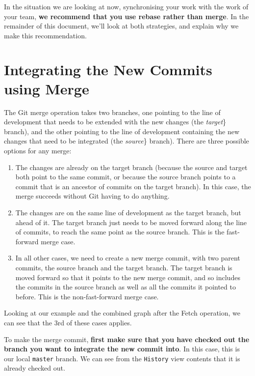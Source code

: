 \documentclass[
]{book}
\providecommand{\tightlist}{%
  \setlength{\itemsep}{0pt}\setlength{\parskip}{0pt}}
\begin{document}
In the situation we are looking at now, synchronising your work with the work of your team, \textbf{we recommend that you use rebase rather than merge}. In the remainder of this document, we'll look at both strategies, and explain why we make this recommendation.

\hypertarget{integrating-the-new-commits-using-merge}{%
\section{Integrating the New Commits using Merge}\label{integrating-the-new-commits-using-merge}}

The Git merge operation takes two branches, one pointing to the line of development that needs to be extended with the new changes (the \emph{target}\} branch), and the other pointing to the line of development containing the new changes that need to be integrated (the \emph{source}\} branch). There are three possible options for any merge:

\begin{enumerate}
\def\labelenumi{\arabic{enumi}.}
\tightlist
\item
  The changes are already on the target branch (because the source and target both point to the same commit, or because the source branch points to a commit that is an ancestor of commits on the target branch). In this case, the merge succeeds without Git having to do anything.
\item
  The changes are on the same line of development as the target branch, but ahead of it. The target branch just needs to be moved forward along the line of commits, to reach the same point as the source branch. This is the fast-forward merge case.
\item
  In all other cases, we need to create a new merge commit, with two parent commits, the source branch and the target branch. The target branch is moved forward so that it points to the new merge commit, and so includes the commits in the source branch as well as all the commits it pointed to before. This is the non-fast-forward merge case.
\end{enumerate}

Looking at our example and the combined graph after the Fetch operation, we can see that the 3rd of these cases applies.

To make the merge commit, \textbf{first make sure that you have checked out the branch you want to integrate the new commit into}. In this case, this is our local \texttt{master} branch. We can see from the \texttt{History} view contents that it is already checked out.
\end{document}
